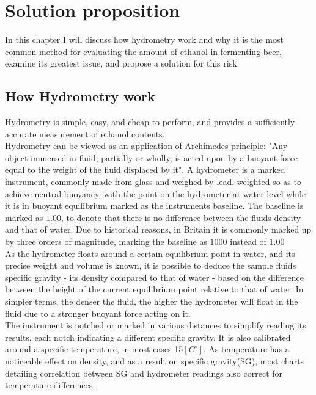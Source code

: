 \documentclass[twoside]{ctuthesis}
\theoremstyle{plain}
\theoremstyle{definition}
\theoremstyle{note}
\begin{document}
\chapter{Solution proposition}
In this chapter I will discuss how hydrometry work and why it is the most common method for evaluating the amount of ethanol in fermenting beer, examine its greatest issue, and propose a solution for this risk.

\section{How Hydrometry work}
Hydrometry is simple, easy, and cheap to perform, and provides a sufficiently accurate measurement of ethanol contents.\\
Hydrometry can be viewed as an application of Archimedes principle: "Any object immersed in fluid, partially or wholly, is acted upon by a buoyant force equal to the weight of the fluid displaced by it". A hydrometer is a marked instrument, commonly made from glass and weighed by lead\cite{Ethanol_Measurement}, weighted so as to achieve neutral buoyancy, with the point on the hydrometer at water level while it is in buoyant equilibrium marked as the instruments baseline. The baseline is marked as $1.00$, to denote that there is no difference between the fluids density and that of water. Due to historical reasons, in Britain it is commonly marked up by three orders of magnitude, marking the baseline as $1000$\cite{Brewing_Science} instead of $1.00$\\
As the hydrometer floats around a certain equilibrium point in water, and its precise weight and volume is known, it is possible to deduce the sample fluids specific gravity - its density compared to that of water - based on the difference between the height of the current equilibrium point relative to that of water. In simpler terms, the denser the fluid, the higher the hydrometer will float in the fluid due to a stronger buoyant force acting on it.\\
The instrument is notched or marked in various distances to simplify reading its results, each notch indicating a different specific gravity. It is also calibrated around a specific temperature, in most cases 15$[C^{\circ}]$\cite{Ethanol_Measurement}. As temperature has a noticeable effect on density, and as a result on specific gravity(SG), most charts detailing correlation between SG and hydrometer readings also correct for temperature differences.\\
\end{document}
